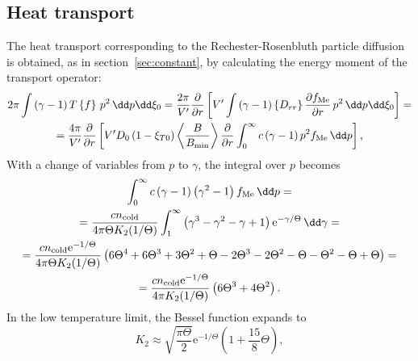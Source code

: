 \documentclass{notes}
\newcommand{\ee}{\mathrm{e}}
\newcommand{\fMe}{f_{\rm Me}}
\newcommand{\ncold}{n_{\rm cold}}
\begin{document}
    \subsection{Heat transport}
    The heat transport corresponding to the Rechester-Rosenbluth particle
    diffusion is obtained, as in section~\ref{sec:constant}, by calculating the
    energy moment of the transport operator:
    \begin{equation}
        \begin{gathered}
            2\pi\int\left(\gamma-1\right) T\left\{f\right\}\,p^2\,\dd p\dd\xi_0 =
                \frac{2\pi}{V'}\frac{\partial}{\partial r}\left[ V'
                    \int\left(\gamma-1\right)\left\{D_{rr}\right\} \frac{\partial\fMe}{\partial r}\,p^2\,\dd p\dd\xi_0
                \right] =\\
            = \frac{4\pi}{V'}\frac{\partial}{\partial r}\left[ V'D_0
                \left(1-\xi_{T0}\right)\left\langle\frac{B}{B_{\rm min}}\right\rangle
                \frac{\partial}{\partial r}\int_0^\infty c\left(\gamma-1\right)p^2\fMe\,\dd p
            \right],
        \end{gathered}
    \end{equation}
    With a change of variables from $p$ to $\gamma$, the integral over $p$
    becomes
    \begin{equation}
        \begin{gathered}
            \int_0^\infty c\left(\gamma-1\right)\left(\gamma^2-1\right)\fMe\,\dd p =\\
            = \frac{c\ncold}{4\pi\Theta K_2(1/\Theta)}\int_1^\infty\left(\gamma^3-\gamma^2-\gamma+1\right)\ee^{-\gamma/\Theta}\,\dd\gamma =\\
            = \frac{c\ncold\ee^{-1/\Theta}}{4\pi\Theta K_2(1/\Theta)}\left(
                6\Theta^4 + 6\Theta^3 + 3\Theta^2 + \Theta - 2\Theta^3 - 2\Theta^2 - \Theta -
                \Theta^2 - \Theta + \Theta
            \right) =\\
            = \frac{c\ncold\ee^{-1/\Theta}}{4\pi K_2(1/\Theta)}\left(
                6\Theta^3 + 4\Theta^2
            \right).
        \end{gathered}
    \end{equation}
    In the low temperature limit, the Bessel function expands to
    \begin{equation}
        K_2\approx \sqrt{\frac{\pi\Theta}{2}}\ee^{-1/\Theta}\left( 1 + \frac{15}{8}\Theta \right),
    \end{equation}
\end{document}

